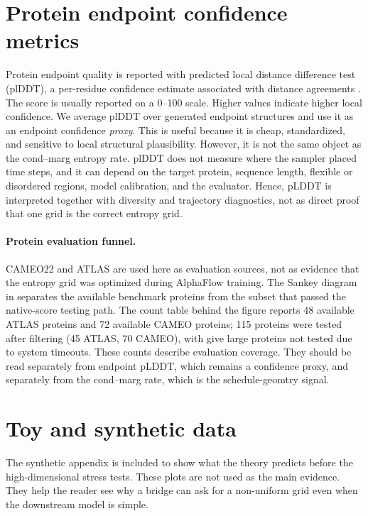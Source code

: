 \documentclass{article}
\theoremstyle{plain}
\theoremstyle{definition}
\theoremstyle{remark}
\begin{document}
\section{Protein endpoint confidence metrics}
\label{app:plddt_metric}

Protein endpoint quality is reported with predicted local distance difference test (plDDT), a per-residue confidence estimate associated with distance agreements \citep{jumper2021, mariani2013lddt}. The score is usually reported on a 0--100 scale. Higher values indicate higher local confidence. We average plDDT over generated endpoint structures and use it as an endpoint confidence \emph{proxy}. This is useful because it is cheap, standardized, and sensitive to local structural plausibility. However, it is not the same object as the cond--marg entropy rate. plDDT does not measure where the sampler placed time steps, and it can depend on the target protein, sequence length, flexible or disordered regions, model calibration, and the evaluator. Hence, pLDDT is interpreted together with diversity and trajectory diagnostics, not as direct proof that one grid is the correct entropy grid.

\paragraph{Protein evaluation funnel.}
\label{app:protein_eval_funnel}
CAMEO22 and ATLAS are used here as evaluation sources, not as evidence that the entropy grid was optimized during AlphaFlow training. The Sankey diagram in  separates the available benchmark proteins from the subset that passed the native-score testing path. The count table behind the figure reports 48 available ATLAS proteins and 72 available CAMEO proteins; 115 proteins were tested after filtering (45 ATLAS, 70 CAMEO), with give large proteins not tested due to system timeouts. These counts describe evaluation coverage. They should be read separately from endpoint pLDDT, which remains a confidence proxy, and separately from the cond--marg rate, which is the schedule-geomtry signal.


\section{Toy and synthetic data}
\label{app:figures}

The synthetic appendix is included to show what the theory predicts before the high-dimensional stress tests. These plots are not used as the main evidence. They help the reader see why a bridge can ask for a non-uniform grid even when the downstream model is simple.
\end{document}
